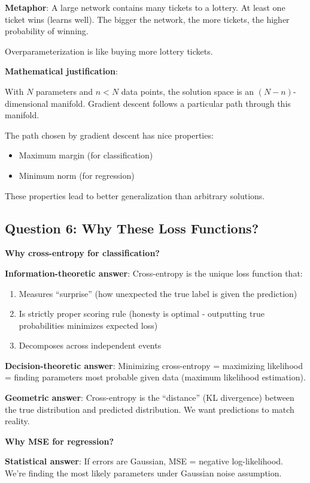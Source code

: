 \documentclass[11pt,oneside]{book}
\begin{document}
\textbf{Metaphor}: A large network contains many tickets to a lottery. At least one ticket wins (learns well). The bigger the network, the more tickets, the higher probability of winning.

Overparameterization is like buying more lottery tickets.

\textbf{Mathematical justification}:

With $N$ parameters and $n < N$ data points, the solution space is an $(N-n)$-dimensional manifold. Gradient descent follows a particular path through this manifold.

The path chosen by gradient descent has nice properties:
\begin{itemize}
\item Maximum margin (for classification)
\item Minimum norm (for regression)
\end{itemize}

These properties lead to better generalization than arbitrary solutions.

\subsection{Question 6: Why These Loss Functions?}

\textbf{Why cross-entropy for classification?}

\textbf{Information-theoretic answer}: Cross-entropy is the unique loss function that:
\begin{enumerate}
\item Measures ``surprise'' (how unexpected the true label is given the prediction)
\item Is strictly proper scoring rule (honesty is optimal - outputting true probabilities minimizes expected loss)
\item Decomposes across independent events
\end{enumerate}

\textbf{Decision-theoretic answer}: Minimizing cross-entropy = maximizing likelihood = finding parameters most probable given data (maximum likelihood estimation).

\textbf{Geometric answer}: Cross-entropy is the ``distance'' (KL divergence) between the true distribution and predicted distribution. We want predictions to match reality.

\textbf{Why MSE for regression?}

\textbf{Statistical answer}: If errors are Gaussian, MSE = negative log-likelihood. We're finding the most likely parameters under Gaussian noise assumption.
\end{document}
